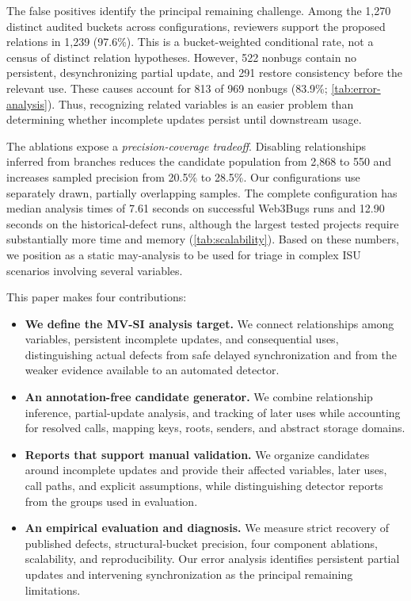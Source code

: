The false positives identify the principal remaining challenge. Among the 1,270 distinct audited buckets across configurations, reviewers support the proposed relations in 1,239 (97.6\%). This is a bucket-weighted conditional rate, not a census of distinct relation hypotheses. However, 522 nonbugs contain no persistent, desynchronizing partial update, and 291 restore consistency before the relevant use. These causes account for 813 of 969 nonbugs (83.9\%; \autoref{tab:error-analysis}). Thus, recognizing related variables is an easier problem than determining whether incomplete updates persist until downstream usage.

The ablations expose a \textit{precision-coverage tradeoff}. Disabling relationships inferred from branches reduces the candidate population from 2,868 to 550 and increases sampled precision from 20.5\% to 28.5\%. Our configurations use separately drawn, partially overlapping samples. The complete configuration has median analysis times of 7.61 seconds on successful Web3Bugs runs and 12.90 seconds on the historical-defect runs, although the largest tested projects require substantially more time and memory (\autoref{tab:scalability}). Based on these numbers, we position \sys{} as a static may-analysis to be used for triage in complex ISU scenarios involving several variables.

This paper makes four contributions:

\begin{itemize}[leftmargin=*,nosep]

  \item \textbf{We define the MV-SI analysis target.}
  We connect relationships among variables, persistent incomplete updates, and consequential uses, distinguishing actual defects from safe delayed synchronization and from the weaker evidence available to an automated detector.

  \item \textbf{An annotation-free candidate generator.}
  We combine relationship inference, partial-update analysis, and tracking of later uses while accounting for resolved calls, mapping keys, roots, senders, and abstract storage domains.

  \item \textbf{Reports that support manual validation.}
  We organize candidates around incomplete updates and provide their affected variables, later uses, call paths, and explicit assumptions, while distinguishing detector reports from the groups used in evaluation.

  \item \textbf{An empirical evaluation and diagnosis.}
  We measure strict recovery of published defects, structural-bucket precision, four component ablations, scalability, and reproducibility. Our error analysis identifies persistent partial updates and intervening synchronization as the principal remaining limitations.

\end{itemize}
